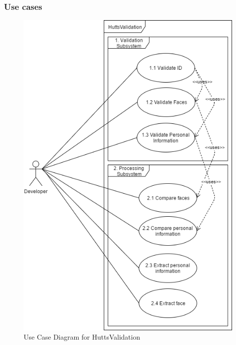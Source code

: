 \documentclass{article}
\begin{document}
		\subsubsection{Use cases}
		\begin{figure}[h]
			\includegraphics[scale=0.6]{img/UseCase.png}
			\caption{Use Case Diagram for HuttsValidation}
		\end{figure}
\end{document}
